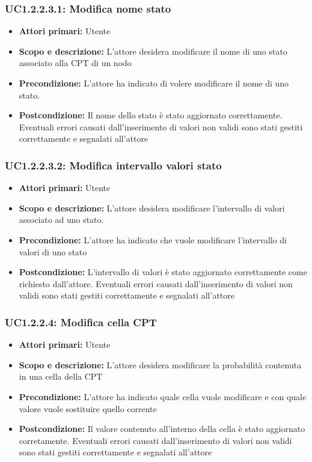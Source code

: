 \subsubsection{UC1.2.2.3.1: Modifica nome stato} 
\begin{itemize} 
	\item{\textbf{Attori primari:} Utente} 
	\item{\textbf{Scopo e descrizione:} L'attore desidera modificare il nome di uno stato associato alla CPT di un nodo} 
	\item{\textbf{Precondizione:} L'attore ha indicato di volere modificare il nome di uno stato.} 
	\item{\textbf{Postcondizione:} Il nome dello stato è stato aggiornato correttamente. Eventuali errori causati dall'inserimento di valori non validi sono stati gestiti correttamente e segnalati all'attore} 
\end{itemize} 
\subsubsection{UC1.2.2.3.2: Modifica intervallo valori stato} 
\begin{itemize} 
	\item{\textbf{Attori primari:} Utente} 
	\item{\textbf{Scopo e descrizione:} L'attore desidera modificare l'intervallo di valori associato ad uno stato.} 
	\item{\textbf{Precondizione:} L'attore ha indicato che vuole modificare l'intervallo di valori di uno stato} 
	\item{\textbf{Postcondizione:} L'intervallo di valori è stato aggiornato correttamente come richiesto dall'attore. Eventuali errori causati dall'inserimento di valori non validi sono stati gestiti correttamente e segnalati all'attore} 
\end{itemize} 
\subsubsection{UC1.2.2.4: Modifica cella CPT} 
\begin{itemize} 
	\item{\textbf{Attori primari:} Utente} 
	\item{\textbf{Scopo e descrizione:} L'attore desidera modificare la probabilità contenuta in una cella della CPT} 
	\item{\textbf{Precondizione:} L'attore ha indicato quale cella vuole modificare e con quale valore vuole sostituire quello corrente} 
	\item{\textbf{Postcondizione:} Il valore contenuto all'interno della cella è stato aggiornato corretamente. Eventuali errori causati dall'inserimento di valori non validi sono stati gestiti correttamente e segnalati all'attore} 
\end{itemize} 
